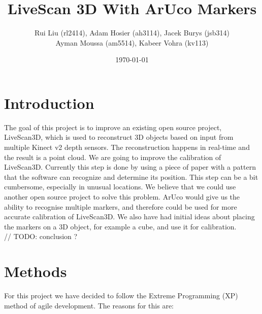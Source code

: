 \documentclass[a4paper,12pt]{article}
\title{LiveScan 3D With ArUco Markers}
\author{Rui Liu (rl2414), Adam Hosier (ah3114), Jacek Burys (jsb314)\\Ayman Moussa (am5514), Kabeer Vohra (kv113)}
\date{\today}
\begin{document}
\maketitle

\iffalse
The intent of this project is to introduce an improvement on an open source real time 3D reconstruction library, LiveScan3D (https://github.com/MarekKowalski/LiveScan3D).
LiveScan3D is a system designed for 3D reconstruction using multiple Kinect v2 depth sensors simultaneously in real time.
This library contains code for calibration of the relative postitions of different sensors. However, this part is a bit cumbersome.
The goal is to use another library, ArUco (http://www.uco.es/investiga/grupos/ava/node/26) to simplify, and potentually improve the accuracy of the calibration process. 
\fi

\section*{Introduction}

The goal of this project is to improve an existing open source project,
LiveScan3D, which is used to reconstruct 3D objects based on input from 
multiple Kinect v2 depth sensors. The reconstruction happens in real-time 
and the result is a point cloud. 
We are going to improve the calibration of LiveScan3D. Currently this step is
done by using a piece of paper with a pattern that the software can
recognize and determine its position. This step can be a bit cumbersome,
especially in unusual locations. 
We believe that we could use another open source project to solve this problem.
ArUco would give us the ability to recognise multiple markers, and therefore
could be used for more accurate calibration of LiveScan3D. We also have had
initial ideas about placing the markers on a 3D object, for example a cube,
and use it for calibration. \\
// TODO: conclusion ?

\section*{Methods}
For this project we have decided to follow the Extreme Programming (XP) method of agile development. The reasons for this are:
\end{document}
